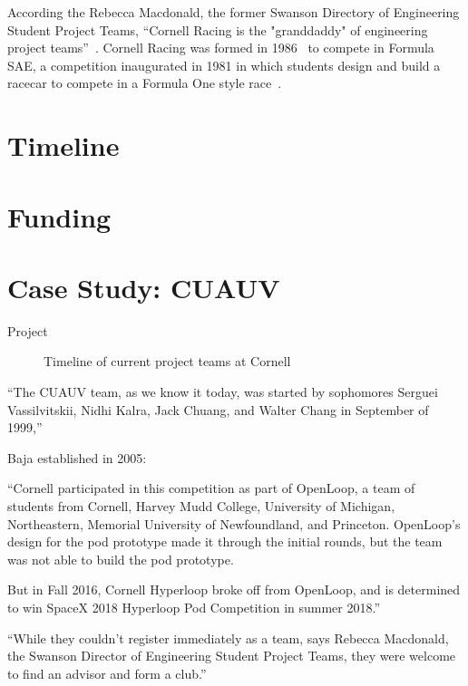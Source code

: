 \documentclass[12pt]{article}
\begin{document}
According the Rebecca Macdonald, the former Swanson Directory of Engineering Student Project Teams, ``Cornell Racing is the "granddaddy" of engineering project teams''~\cite{klein_engineering_2015}. Cornell Racing was formed in 1986~\cite{noauthor_cornell_2012} to compete in Formula SAE, a competition inaugurated in 1981 in which students design and build a racecar to compete in a Formula One style race~\cite{sae_international_formula_2018}.


\section{Timeline}
\label{sec:timeline}

\section{Funding}
\label{sec:funding}

\section{Case Study: CUAUV}
\label{sec:cuauv}

Project

\begin{landscape}
  \begin{figure}
    
    \caption{Timeline of current project teams at Cornell}
    \label{fig:timeline}
  \end{figure}
\end{landscape}

``The CUAUV team, as we know it today, was started by sophomores Serguei Vassilvitskii, Nidhi Kalra, Jack Chuang, and Walter Chang in September of 1999,''
\cite{noauthor_cuauv_2003}

Baja established in 2005:
\cite{noauthor_history_2017}

``Cornell participated in this competition as part of OpenLoop, a team of students from Cornell, Harvey Mudd College, University of Michigan, Northeastern, Memorial University of Newfoundland, and Princeton.  OpenLoop’s design for the pod prototype made it through the initial rounds, but the team was not able to build the pod prototype.

But in Fall 2016, Cornell Hyperloop broke off from OpenLoop, and is determined to win SpaceX 2018 Hyperloop Pod Competition in summer 2018.''
\cite{roseman_how_2017}

``While they couldn’t register immediately as a team, says Rebecca Macdonald, the Swanson Director of Engineering Student Project Teams, they were welcome to find an advisor and form a club.''
\cite{giller_openloop:_2016}
\end{document}
